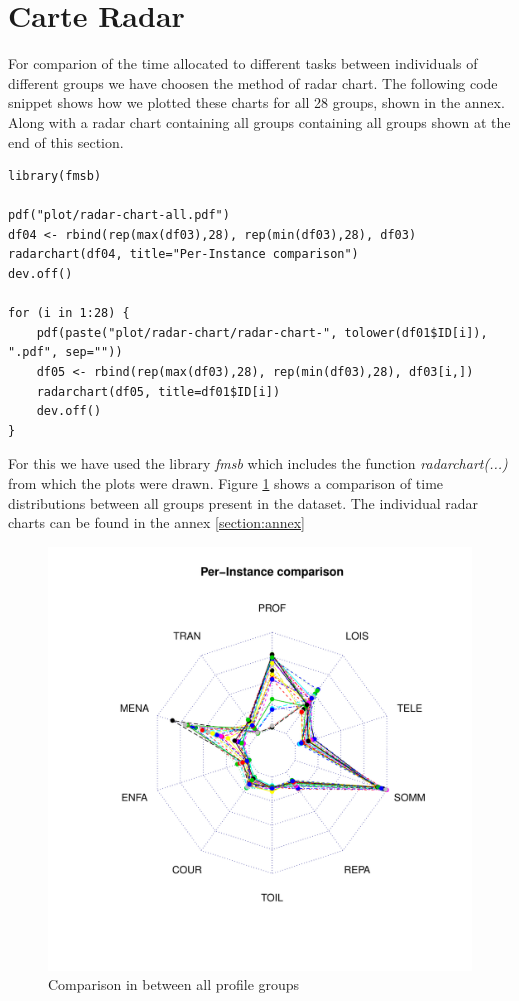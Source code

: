 \documentclass[11pt]{article}
\begin{document}
\section{Carte Radar}
For comparion of the time allocated to different tasks between individuals of
different groups we have choosen the method of radar chart. The following code
snippet shows how we plotted these charts for all 28 groups, shown in the
annex. Along with a radar chart containing all groups containing all groups
shown at the end of this section.
\begin{verbatim}
library(fmsb)

pdf("plot/radar-chart-all.pdf")
df04 <- rbind(rep(max(df03),28), rep(min(df03),28), df03)
radarchart(df04, title="Per-Instance comparison")
dev.off()

for (i in 1:28) {
    pdf(paste("plot/radar-chart/radar-chart-", tolower(df01$ID[i]), ".pdf", sep=""))
    df05 <- rbind(rep(max(df03),28), rep(min(df03),28), df03[i,])
    radarchart(df05, title=df01$ID[i])
    dev.off()
}
\end{verbatim}
For this we have used the library \textit{fmsb} which includes the function
\textit{radarchart(...)} from which the plots were drawn. Figure
\ref{fig:radar-chart-all} shows a comparison of time distributions between all
groups present in the dataset. The individual radar charts can be found in the
annex \ref{section:annex}
\begin{figure}[h]
  \centering
  \includegraphics[scale=0.55]{../plot/radar-chart-all.pdf}
  \caption{Comparison in between all profile groups}
  \label{fig:radar-chart-all}
\end{figure}
\end{document}
